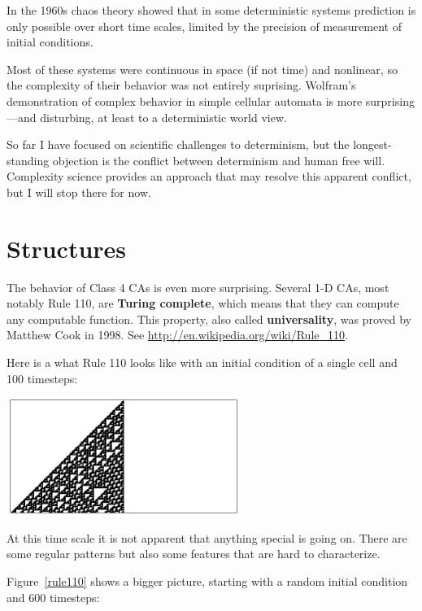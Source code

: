 \documentclass[10pt]{book}
\begin{document}
In the 1960s chaos theory showed that in some deterministic systems
prediction is only possible over short time scales,  limited by
the precision of measurement of initial conditions.

Most of these systems were continuous in space (if not time) and
nonlinear, so the complexity of their behavior was not entirely
suprising.  Wolfram's demonstration of complex behavior in simple
cellular automata is more surprising---and disturbing, at least to a
deterministic world view.

So far I have focused on scientific challenges to determinism, but the
longest-standing objection is the conflict between
determinism and human free will.  Complexity science provides
an approach that may resolve this apparent conflict, but I
will stop there for now.


\section{Structures}

The behavior of Class 4 CAs is even more surprising.  Several 1-D CAs,
most notably Rule 110, are {\bf Turing complete}, which means that
they can compute any computable function.  This property, also called
{\bf universality}, was proved by Matthew Cook in 1998.  See
\url{http://en.wikipedia.org/wiki/Rule_110}.

Here is a what Rule 110 looks like with an initial condition of
a single cell and 100 timesteps:

\beforefig
\centerline{\includegraphics[width=3.0in,height=1.5in]{figs/rule110.eps}}
\afterfig

At this time scale it is not apparent that anything special is
going on.  There are some regular patterns but also some features
that are hard to characterize.

Figure~\ref{rule110} shows a bigger picture, starting with a random initial
condition and 600 timesteps:
\end{document}
